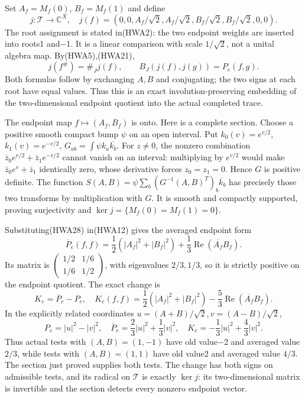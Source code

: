\documentclass[
  10pt,
  a4paper,
]{article}
\begin{document}
Set \(A_f=M_f(0)\), \(B_f=M_f(1)\) and define \[
j:\mathcal T\to\mathbb C^X,
\quad j(f)=(0,0,A_f/\sqrt2,A_f/\sqrt2,
B_f/\sqrt2,B_f/\sqrt2,0,0).
\tag{HWA28}
\] The root assignment is stated in(HWA2): the two endpoint weights are
inserted into roots1 and−1. It is a linear comparison with scale
\(1/\sqrt2\), not a unital algebra map. By(HWA5),(HWA21), \[
j(f^\#)=\#_Jj(f),\qquad
B_J(j(f),j(g))=P_e(f,g).
\tag{HWA29}
\] Both formulas follow by exchanging \(A,B\) and conjugating; the two
signs at each root have equal values. Thus this is an exact
involution-preserving embedding of the two-dimensional endpoint quotient
into the actual completed trace.

The endpoint map \(f\mapsto(A_f,B_f)\) is onto. Here is a complete
section. Choose a positive smooth compact bump \(\psi\) on an open
interval. Put \(k_0(v)=e^{v/2}\), \(k_1(v)=e^{-v/2}\),
\(G_{ab}=\int\psi k_a\overline{k_b}\). For \(z\ne0\), the nonzero
combination \(\bar z_0e^{v/2}+\bar z_1e^{-v/2}\) cannot vanish on an
interval: multiplying by \(e^{v/2}\) would make \(\bar z_0e^v+\bar z_1\)
identically zero, whose derivative forces \(z_0=z_1=0\). Hence \(G\) is
positive definite. The function
\(S(A,B)=\psi\sum_b(G^{-1}(A,B)^T)_b\overline{k_b}\) has precisely those
two transforms by multiplication with \(G\). It is smooth and compactly
supported, proving surjectivity and \(\ker j=\{M_f(0)=M_f(1)=0\}\).

Substituting(HWA28) in(HWA12) gives the averaged endpoint form \[
\overline P_e(f,f)=\frac12(|A_f|^2+|B_f|^2)
 +\frac13\operatorname{Re}(\overline{A_f}B_f).
\tag{HWA30}
\] Its matrix is
\(\left(\begin{smallmatrix}1/2&1/6\\1/6&1/2\end{smallmatrix}\right)\),
with eigenvalues \(2/3,1/3\), so it is strictly positive on the endpoint
quotient. The exact change is \[
K_e=\overline P_e-P_e,
\quad
K_e(f,f)=\frac12(|A_f|^2+|B_f|^2)
-\frac53\operatorname{Re}(\overline{A_f}B_f).
\tag{HWA31}
\] In the explicitly related coordinates
\(u=(A+B)/\sqrt2,v=(A-B)/\sqrt2\), \[
P_e=|u|^2-|v|^2,
\quad\overline P_e=\frac23|u|^2+\frac13|v|^2,
\quad K_e=-\frac13|u|^2+\frac43|v|^2.
\tag{HWA32}
\] Thus actual tests with \((A,B)=(1,-1)\) have old value−2 and averaged
value \(2/3\), while tests with \((A,B)=(1,1)\) have old value2 and
averaged value \(4/3\). The section just proved supplies both tests. The
change has both signs on admissible tests, and its radical on
\(\mathcal T\) is exactly \(\ker j\): its two-dimensional matrix is
invertible and the section detects every nonzero endpoint vector.
\end{document}
